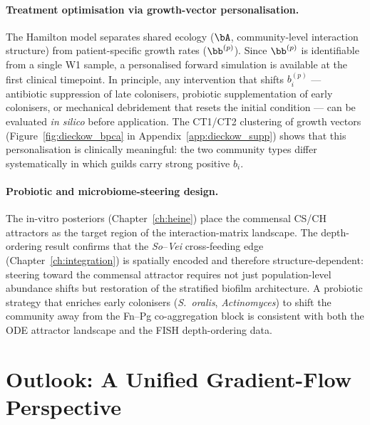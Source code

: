 \paragraph{Treatment optimisation via growth-vector personalisation.}
The Hamilton model separates shared ecology ($\bA$, community-level interaction
structure) from patient-specific growth rates ($\bb^{(p)}$). Since $\bb^{(p)}$ is
identifiable from a single W1 sample, a personalised forward simulation is
available at the first clinical timepoint. In principle, any intervention that
shifts $b_i^{(p)}$ --- antibiotic suppression of late colonisers, probiotic
supplementation of early colonisers, or mechanical debridement that resets the
initial condition --- can be evaluated \emph{in silico} before application. The CT1/CT2
clustering of growth vectors (Figure~\ref{fig:dieckow_bpca} in
Appendix~\ref{app:dieckow_supp}) shows that this personalisation is clinically
meaningful: the two community types differ systematically in which guilds carry
strong positive $b_i$.

\paragraph{Probiotic and microbiome-steering design.}
The in-vitro posteriors (Chapter~\ref{ch:heine}) place the
commensal CS/CH attractors as the target region of the interaction-matrix landscape.
The depth-ordering result confirms that the \textit{So}--\textit{Vei} cross-feeding
edge (Chapter~\ref{ch:integration}) is spatially encoded and therefore structure-dependent:
steering toward the commensal attractor requires not just population-level abundance
shifts but restoration of the stratified biofilm architecture. A probiotic strategy
that enriches early colonisers (\textit{S.~oralis}, \textit{Actinomyces}) to shift
the community away from the Fn--Pg co-aggregation block is consistent with both the
ODE attractor landscape and the FISH depth-ordering data.

\section{Outlook: A Unified Gradient-Flow Perspective}
\label{sec:integration_outlook}

